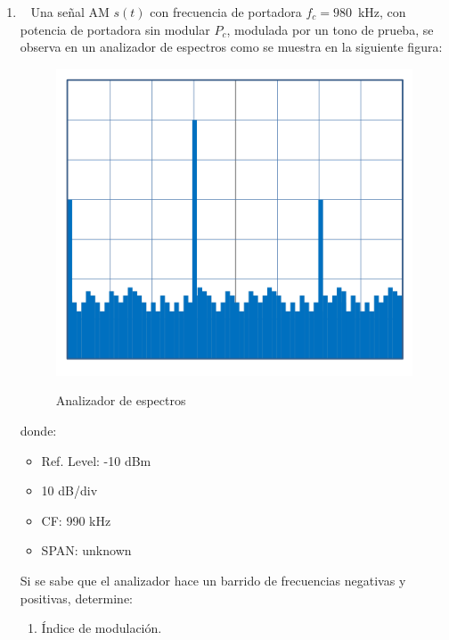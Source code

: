\begin{enumerate}
\item~ Una señal AM $s(t)$ con frecuencia de portadora $f_c = 980$~kHz, con potencia de portadora sin modular $P_c$, modulada por un tono de prueba, se observa en un analizador de espectros como se muestra en la siguiente figura:
\vspace{50px}
	\begin{figure}[h!]
	\captionsetup{justification = raggedright, singlelinecheck = false}
	\caption{Analizador de espectros} 
	\centering
	\includegraphics[scale=0.5]{Imagenes/fig4.png}
	\label{fig:fig4}
\end{figure}

donde:
\begin{itemize}
	\item Ref. Level: -10 dBm
	\item 10 dB/div
	\item CF: 990 kHz
	\item SPAN: unknown
\end{itemize}
Si se sabe que el analizador hace un barrido de frecuencias negativas y positivas, determine:

\begin{enumerate}
	\item Índice de modulación.
	

\end{enumerate}
\end{enumerate}
